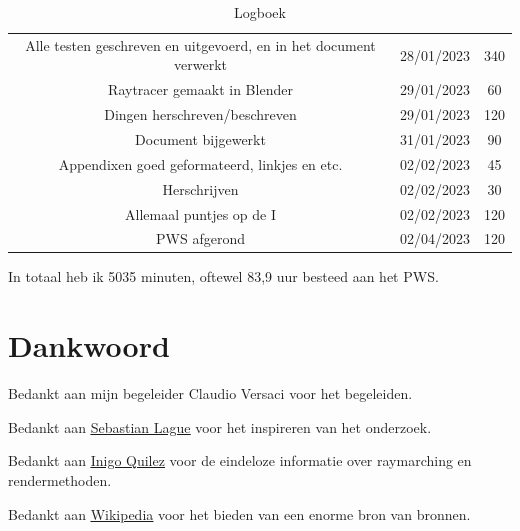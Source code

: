 \documentclass[12pt, a4paper]{article}
\begin{document}
\begin{table}[!htp]
{\begin{tabular}{| c c c |}
			Alle testen geschreven en uitgevoerd, en in het document verwerkt    & 28/01/2023 & 340            \\
			Raytracer gemaakt in Blender                                         & 29/01/2023 & 60             \\
			Dingen herschreven/beschreven                                        & 29/01/2023 & 120            \\
			Document bijgewerkt                                                  & 31/01/2023 & 90             \\
			Appendixen goed geformateerd, linkjes en etc.                        & 02/02/2023 & 45             \\
			Herschrijven                                                         & 02/02/2023 & 30             \\
			Allemaal puntjes op de I                                             & 02/02/2023 & 120            \\
			PWS afgerond                                                         & 02/04/2023 & 120           \\
			\hline
		\end{tabular}
	}
	\caption{Logboek}
\end{table}

In totaal heb ik 5035 minuten, oftewel 83,9 uur besteed aan het PWS.

\section{Dankwoord}

Bedankt aan mijn begeleider Claudio Versaci voor het begeleiden.

Bedankt aan \underline{\hyperlink{https://www.youtube.com/@SebastianLague}{Sebastian Lague}} voor het inspireren van het onderzoek.

Bedankt aan \underline{\hyperlink{https://iquilezles.org/}{Inigo Quilez}} voor de eindeloze informatie over raymarching en rendermethoden.

Bedankt aan \underline{\hyperlink{https://wikipedia.org/}{Wikipedia}} voor het bieden van een enorme bron van bronnen.

\appendix
\renewcommand{\thesection}{\Alph{section}}
\renewcommand{\thesubsection}{\thesection.\arabic{subsection}}
\renewcommand{\section}{\secdef\Appendix\Appendix}
\newcommand{\Appendix}[2][?]{%
	\refstepcounter{section}%
	\addcontentsline{toc}{section}{Appendix \thesection\ #1}%
	\vspace{0.5cm}
	{\noindent\large\bfseries Appendix \thesection\ #2}%
	\vspace{0.3cm}}
\clearpage
\makeatletter
\renewcommand\listoffigures{%
	\@starttoc{lof}%
}
\makeatother
\end{document}
